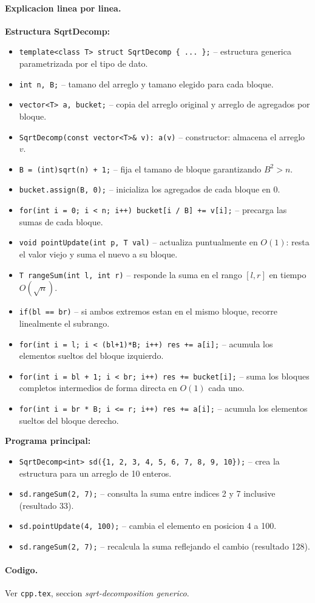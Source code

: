 \paragraph{Explicacion linea por linea.}
\textbf{Estructura SqrtDecomp:}
\begin{itemize}\setlength\itemsep{0pt}
	\item \verb|template<class T> struct SqrtDecomp { ... };| -- estructura generica parametrizada por el tipo de dato.
	\item \verb|int n, B;| -- tamano del arreglo y tamano elegido para cada bloque.
	\item \verb|vector<T> a, bucket;| -- copia del arreglo original y arreglo de agregados por bloque.
	\item \verb|SqrtDecomp(const vector<T>& v): a(v)| -- constructor: almacena el arreglo $v$.
	\item \verb|B = (int)sqrt(n) + 1;| -- fija el tamano de bloque garantizando $B^2 > n$.
	\item \verb|bucket.assign(B, 0);| -- inicializa los agregados de cada bloque en 0.
	\item \verb|for(int i = 0; i < n; i++) bucket[i / B] += v[i];| -- precarga las sumas de cada bloque.
	\item \verb|void pointUpdate(int p, T val)| -- actualiza puntualmente en $O(1)$: resta el valor viejo y suma el nuevo a su bloque.
	\item \verb|T rangeSum(int l, int r)| -- responde la suma en el rango $[l, r]$ en tiempo $O(\sqrt{n})$.
	\item \verb|if(bl == br)| -- si ambos extremos estan en el mismo bloque, recorre linealmente el subrango.
	\item \verb|for(int i = l; i < (bl+1)*B; i++) res += a[i];| -- acumula los elementos sueltos del bloque izquierdo.
	\item \verb|for(int i = bl + 1; i < br; i++) res += bucket[i];| -- suma los bloques completos intermedios de forma directa en $O(1)$ cada uno.
	\item \verb|for(int i = br * B; i <= r; i++) res += a[i];| -- acumula los elementos sueltos del bloque derecho.
\end{itemize}
\textbf{Programa principal:}
\begin{itemize}\setlength\itemsep{0pt}
	\item \verb|SqrtDecomp<int> sd({1, 2, 3, 4, 5, 6, 7, 8, 9, 10});| -- crea la estructura para un arreglo de 10 enteros.
	\item \verb|sd.rangeSum(2, 7);| -- consulta la suma entre indices 2 y 7 inclusive (resultado 33).
	\item \verb|sd.pointUpdate(4, 100);| -- cambia el elemento en posicion 4 a 100.
	\item \verb|sd.rangeSum(2, 7);| -- recalcula la suma reflejando el cambio (resultado 128).
\end{itemize}

\paragraph{Codigo.}
Ver \texttt{cpp.tex}, seccion \textit{sqrt-decomposition generico}.

\vspace{0.5em}
